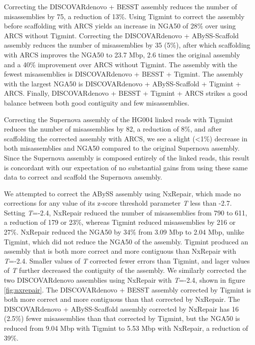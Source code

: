 \documentclass[
  12pt,
  oneside,
  openany]{book}
\begin{document}
Correcting the DISCOVARdenovo + BESST assembly reduces the number of misassemblies by 75, a reduction of 13\%. Using Tigmint to correct the assembly before scaffolding with ARCS yields an increase in NGA50 of 28\% over using ARCS without Tigmint. Correcting the DISCOVARdenovo + ABySS-Scaffold assembly reduces the number of misassemblies by 35 (5\%), after which scaffolding with ARCS improves the NGA50 to 23.7 Mbp, 2.6 times the original assembly and a 40\% improvement over ARCS without Tigmint. The assembly with the fewest misassemblies is DISCOVARdenovo + BESST + Tigmint. The assembly with the largest NGA50 is DISCOVARdenovo + ABySS-Scaffold + Tigmint + ARCS. Finally, DISCOVARdenovo + BESST + Tigmint + ARCS strikes a good balance between both good contiguity and few misassemblies.

Correcting the Supernova assembly of the HG004 linked reads with Tigmint reduces the number of misassemblies by 82, a reduction of 8\%, and after scaffolding the corrected assembly with ARCS, we see a slight (\textless1\%) decrease in both misassemblies and NGA50 compared to the original Supernova assembly. Since the Supernova assembly is composed entirely of the linked reads, this result is concordant with our expectation of no substantial gains from using these same data to correct and scaffold the Supernova assembly.

We attempted to correct the ABySS assembly using NxRepair, which made no corrections for any value of its z-score threshold parameter \emph{T} less than -2.7. Setting \emph{T}=-2.4, NxRepair reduced the number of misassemblies from 790 to 611, a reduction of 179 or 23\%, whereas Tigmint reduced misassemblies by 216 or 27\%. NxRepair reduced the NGA50 by 34\% from 3.09 Mbp to 2.04 Mbp, unlike Tigmint, which did not reduce the NGA50 of the assembly. Tigmint produced an assembly that is both more correct and more contiguous than NxRepair with \emph{T}=-2.4. Smaller values of \emph{T} corrected fewer errors than Tigmint, and lager values of \emph{T} further decreased the contiguity of the assembly. We similarly corrected the two DISCOVARdenovo assemblies using NxRepair with \emph{T}=-2.4, shown in figure \cref{fig:nxrepair}. The DISCOVARdenovo + BESST assembly corrected by Tigmint is both more correct and more contiguous than that corrected by NxRepair. The DISCOVARdenovo + ABySS-Scaffold assembly corrected by NxRepair has 16 (2.5\%) fewer misassemblies than that corrected by Tigmint, but the NGA50 is reduced from 9.04 Mbp with Tigmint to 5.53 Mbp with NxRepair, a reduction of 39\%.
\end{document}
